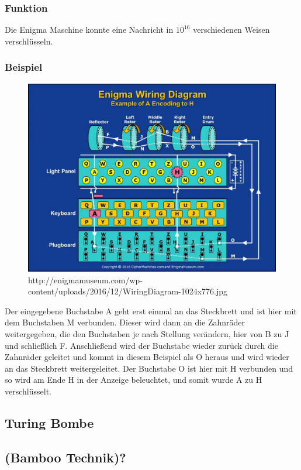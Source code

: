 \subsubsection{Funktion}
Die Enigma Maschine konnte eine Nachricht in $10^{16}$ verschiedenen Weisen verschlüsseln.

\subsubsection{Beispiel}

\begin{figure}[hbtp]
\centering
\includegraphics[scale=0.2]{Enigma_Maschine_Beispiel.jpg}
\caption{http://enigmamuseum.com/wp-content/uploads/2016/12/WiringDiagram-1024x776.jpg}
\end{figure}

Der eingegebene Buchstabe A geht erst einmal an das Steckbrett und ist hier mit dem Buchstaben M verbunden. Dieser wird dann an die Zahnräder weitergegeben, die den Buchstaben je nach Stellung verändern, hier von B zu J und schließlich F. Anschließend wird der Buchstabe wieder zurück durch die Zahnräder geleitet und kommt in diesem Beispiel als O heraus und wird wieder an das Steckbrett weitergeleitet. Der Buchstabe O ist hier mit H verbunden und so wird am Ende H in der Anzeige beleuchtet, und somit wurde A zu H verschlüsselt.

\subsection{Turing Bombe}


\subsection{(Bamboo Technik)?}